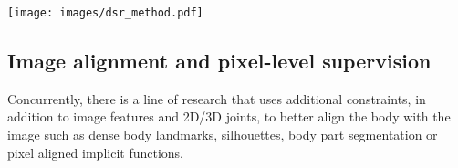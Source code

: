 \documentclass[10pt,twocolumn,letterpaper]{article}
\newcommand{\modelname}[0]{DSR\xspace}
\begin{document}
\begin{figure*}[]
    \texttt{[image: images/dsr\_method.pdf]}
    \caption{\textbf{Illustration of {\modelname}} - SMPL is rendered with the \emph{semantic prior} learned from RenderPeople scans. The two novel loss terms are calculated based on different semantic regions of the clothed person. \modelname-MC tightly fits the minimal-clothed region, while \modelname-C ensures that the rendered body lies within the clothing boundaries.}
    \label{fig:method}
\end{figure*}

\subsection{Image alignment and pixel-level supervision}
Concurrently, there is a line of research that uses additional constraints, in addition to image features and 2D/3D joints, to better align the body with the image such as dense body landmarks, silhouettes, body part segmentation or pixel aligned implicit functions.
\end{document}
